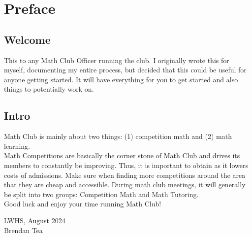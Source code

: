 \chapter*{Preface}

\section*{Welcome}
This to any Math Club Officer running the club. I originally wrote this for myself, documenting 
my entire process, but decided that this could be useful for anyone getting started.
It will have everything for you to get started and also things to potentially work on. 

\section*{Intro}
Math Club is mainly about two things:
(1) competition math and (2) math learning.\\

Math Competitions are basically the corner stone of Math Club and drives its members to
constantly be improving. Thus, it is important to obtain  as it lowers costs of admissions. 
Make sure when finding more competitions around the area that they are cheap and accessible. During math club meetings, 
it will generally be split into two groups: Competition Math and Math Tutoring. \\

Good luck and enjoy your time running Math Club!
    
\begin{flushright}
LWHS, August 2024 \\
Brendan Tea
\end{flushright}